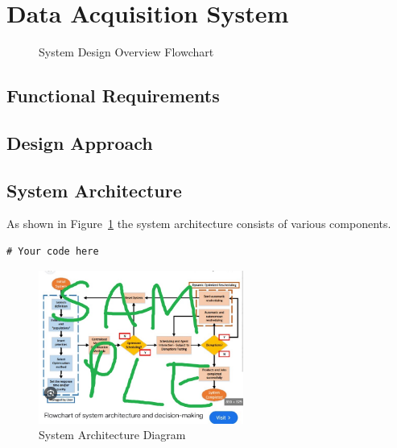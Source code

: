\section{Data Acquisition System}


\begin{figure}[H]
    \centering
    \scalebox{0.8}{ %
    }
    \caption{System Design Overview Flowchart}
    \label{fig:decriptiveLabel22} %
\end{figure}


\subsection{Functional Requirements}

\subsection{Design Approach}

\subsection{System Architecture}
As shown in Figure~\ref{fig:decriptiveLabel22} the system architecture consists of various components.

\begin{lstlisting}[style=cstyle, caption=System Architecture Code Example, label=lst:SystemArchitecture8]
# Your code here
\end{lstlisting}

\begin{figure}[htbp] %
    \centering
    \includegraphics[width=0.6\textwidth]{figures/methodology/system_architecture.jpg}
    \caption{System Architecture Diagram}
    \label{fig:system-architecture3}
\end{figure}

